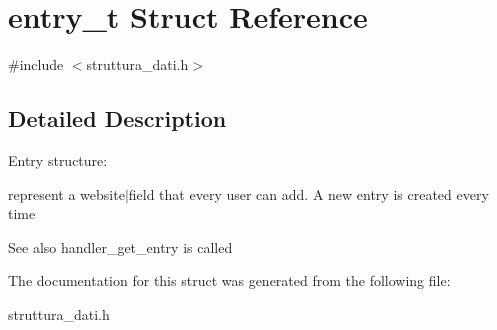\hypertarget{structentry__t}{}\section{entry\+\_\+t Struct Reference}
\label{structentry__t}


{\ttfamily \#include $<$struttura\+\_\+dati.\+h$>$}



\subsection{Detailed Description}
Entry structure\+:

represent a website$\vert$field that every user can add. A new entry is created every time \begin{DoxySeeAlso}{See also}
handler\+\_\+get\+\_\+entry is called 
\end{DoxySeeAlso}


The documentation for this struct was generated from the following file\+:\begin{DoxyCompactItemize}
\item 
struttura\+\_\+dati.\+h\end{DoxyCompactItemize}
